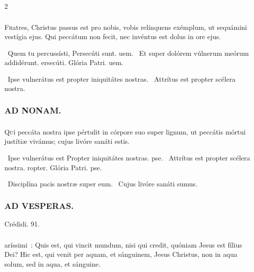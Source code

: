 \documentclass[9pt,twoside]{extarticle}
\begin{document}
\begin{multicols}{2}
\subsubsection*{}
\lettrine{F}ratres, Christus passus est pro nobis, vobis relínquens exémplum, ut sequámini vestígia ejus. Qui peccátum non fecit, nec invéntus est dolus in ore ejus.

\begin{tightlist}{}
\item {}~Quem tu percussísti, \textred{*} Persecúti sunt. uem. ~Et super dolórem vúlnerum meórum addidérunt. ersecúti. Glória Patri. uem.
\item {}~Ipse vulnerátus est propter iniquitátes nostras. ~Attrítus est propter scélera nostra.
\end{tightlist}

\subsubsection*{\center \textsc{AD NONAM.}}
\subsubsection*{}
\lettrine{Q}ui peccáta nostra ipse pértulit in córpore suo super lignum, ut peccátis mórtui justítiæ vivámus; cujus livóre sanáti estis.

\begin{tightlist}{}
\item {}~Ipse vulnerátus est \textred{*} Propter iniquitátes nostras. pse. ~Attrítus est propter scélera nostra. ropter. Glória Patri. pse.
\item {}~Disciplína pacis nostræ super eum. ~Cujus livóre sanáti sumus.
\end{tightlist}

\subsubsection*{\center \textsc{AD VESPERAS.}}
\begin{tightlist}{}
\item {} Crédidi. 91.
\end{tightlist}

\subsubsection*{}
aríssimi~: Quis est, qui vincit mundum, nisi qui credit, quóniam Jesus est fílius Dei? Hic est, qui venit per aquam, et sánguinem, Jesus Christus, non in aqua solum, sed in aqua, et sánguine.


\end{multicols}
\end{document}
